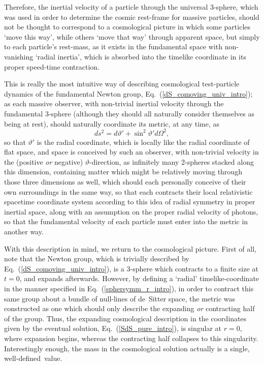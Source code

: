 Therefore, the inertial velocity of a particle through the universal 3-sphere, which was used in order to determine the cosmic rest-frame for massive particles, should not be thought to correspond to a cosmological picture in which some particles `move this way', while others `move that way' through apparent space, but simply to each particle's rest-mass, as it exists in the fundamental space with non-vanishing `radial inertia', which is absorbed into the timelike coordinate in its proper speed-time contraction.

This is really the most intuitive way of describing cosmological test-particle dynamics of the fundamental Newton group, Eq.~(\ref{dS_comoving_univ_intro}); as each massive observer, with non-trivial inertial velocity through the fundamental 3-sphere (although they should all naturally consider themselves as being at rest), should naturally coordinate its metric, at any time, as   
\begin{equation}
ds^2=d\vartheta'+\sin^2\vartheta'{d\Omega}^2,
\end{equation}
so that $\vartheta'$ is the radial coordinate, which is locally like the radial coordinate of flat space, and space is conceived by such an observer, with non-trivial velocity in the (positive \textit{or} negative) $\vartheta$-direction, as infinitely many 2-spheres stacked along this dimension, containing matter which might be relatively moving through those three dimensions as well, which should each personally conceive of their own surroundings in the same way, so that each contracts their local relativistic spacetime coordinate system according to this idea of radial symmetry in proper inertial space, along with an assumption on the proper radial velocity of photons, so that the fundamental velocity of each particle must enter into the metric in another way. 

With this description in mind, we return to the cosmological picture. First of all, note that the Newton group, which is trivially described by Eq.~(\ref{dS_comoving_univ_intro}), is a 3-sphere which contracts to a finite size at $t=0$, and expands afterwards. However, by defining a `radial' timelike-coordinate in the manner specified in Eq.~(\ref{sphersymm_r_intro}), in order to contract this same group about a bundle of null-lines of de~Sitter space, the metric was constructed as one which should only describe the expanding \textit{or} contracting half of the group. Thus, the expanding cosmological description in the coordinates given by the eventual solution, Eq.~(\ref{SdS_pure_intro}), is singular at $r=0$, where expansion begins, whereas the contracting half collapses to this singularity. Interestingly enough, the mass in the cosmological solution actually is a single, well-defined~value.

